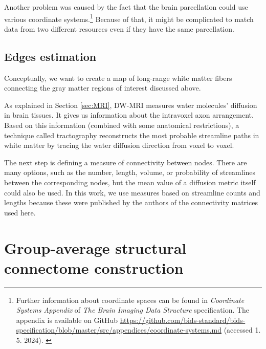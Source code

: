 Another problem was caused by the fact that the brain parcellation could use various coordinate systems.\footnote{Further information about coordinate spaces can be found in \textit{Coordinate Systems Appendix} of \textit{The Brain Imaging Data Structure} specification. The appendix is available on GitHub \url{https://github.com/bids-standard/bids-specification/blob/master/src/appendices/coordinate-systems.md} (accessed 1. 5. 2024). \cite{gorgolewski_brain_2016}} Because of that, it might be complicated to match data from two different resources even if they have the same parcellation.


\subsection{Edges estimation}

Conceptually, we want to create a map of long-range white matter fibers connecting the gray matter regions of interest discussed above. 

As explained in Section \ref{sec:MRI}, DW-MRI measures water molecules' diffusion in brain tissues. It gives us information about the intravoxel axon arrangement. Based on this information (combined with some anatomical restrictions), a technique called tractography reconstructs the most probable streamline paths in white matter by tracing the water diffusion direction from voxel to voxel. \cite{yeh_mapping_2021,iturria-medina_characterizing_2007} 

The next step is defining a measure of connectivity between nodes. There are many options, such as the number, length, volume, or probability of streamlines between the corresponding nodes, but the mean value of a diffusion metric itself could also be used. \cite{yeh_mapping_2021} In this work, we use measures based on streamline counts and lengths because these were published by the authors of the connectivity matrices used here.


\section{Group-average structural connectome construction}\label{sec:group-avg}

